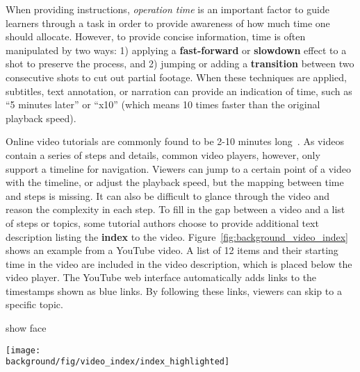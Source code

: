 
When providing instructions, \emph{operation time} is an important factor to guide learners through a task in order to provide awareness of how much time one should allocate.
%
However, to provide concise information, time is often manipulated by two ways: 1) applying a \textbf{fast-forward} or \textbf{slowdown} effect to a shot to preserve the process, and 2) jumping or adding a \textbf{transition} between two consecutive shots to cut out partial footage.
%
When these techniques are applied, subtitles, text annotation, or narration can provide an indication of time, such as ``5 minutes later'' or ``x10'' (which means 10 times faster than the original playback speed).




Online video tutorials are commonly found to be 2-10 minutes long~\cite{Chi:2013:DGC:2501988.2502052}. As videos contain a series of steps and details, common video players, however, only support a timeline for navigation. Viewers can jump to a certain point of a video with the timeline, or adjust the playback speed, but the mapping between time and steps is missing. It can also be difficult to glance through the video and reason the complexity in each step.
%
To fill in the gap between a video and a list of steps or topics, some tutorial authors choose to provide additional text description listing the \textbf{index} to the video. Figure~\ref{fig:background_video_index} shows an example from a YouTube video. A list of 12 items and their starting time in the video are included in the video description, which is placed below the video player. The YouTube web interface automatically adds links to the timestamps shown as blue links. By following these links, viewers can skip to a specific topic.

show face~\cite{Kizilcec:2014:SFV:2556288.2557207}

\begin{figure*}[h!]
  \centering
  \texttt{[image: \\background/fig/video\_index/index\_highlighted]}
  \begin{minipage}{\textwidth}
  \caption[Example video index to video instructions provided by authors for viewers to navigate between topics.]{
    Example video index to video instructions\footnote{Mountain Buggy, Urban Jungle ™ Stroller Instructions, \url{https://youtu.be/QwCtdpDmYu8}} provided by authors for viewers to navigate between topics.
  }
  \label{fig:background_video_index}
  \end{minipage}
\end{figure*}

